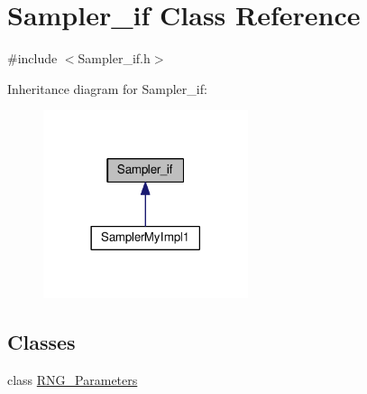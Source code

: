 \hypertarget{class_sampler__if}{\section{Sampler\-\_\-if Class Reference}
\label{class_sampler__if}
}


{\ttfamily \#include $<$Sampler\-\_\-if.\-h$>$}



Inheritance diagram for Sampler\-\_\-if\-:
\nopagebreak
\begin{figure}[H]
\begin{center}
\leavevmode
\includegraphics[width=170pt]{class_sampler__if__inherit__graph}
\end{center}
\end{figure}
\subsection*{Classes}
\begin{DoxyCompactItemize}
\item 
class \hyperlink{class_sampler__if_1_1_r_n_g___parameters}{R\-N\-G\-\_\-\-Parameters}
\end{DoxyCompactItemize}
